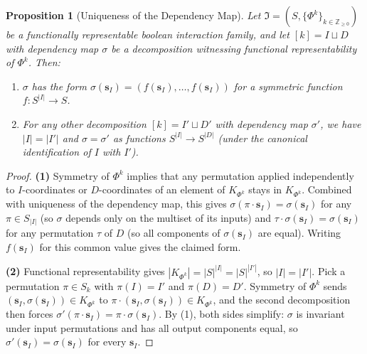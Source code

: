 \documentclass[11pt,reqno]{amsart}
\newcommand{\vecs}{\boldsymbol{s}}
\newcommand{\IFam}{\mathfrak{I}}
\theoremstyle{plain}
\newtheorem{proposition}[theorem]{Proposition}
\theoremstyle{definition}
\numberwithin{equation}{section}
\begin{document}
\begin{proposition}[Uniqueness of the Dependency Map]
\label{prop:func_decomp_equiv}
Let $\IFam = (S, \{\Phi^k\}_{k \in \mathbb{Z}_{\geq 0}})$ be a
functionally representable boolean interaction family, and let
$[k] = I \sqcup D$ with dependency map $\sigma$ be a decomposition
witnessing functional representability of $\Phi^k$. Then:
\begin{enumerate}
    \item $\sigma$ has the form $\sigma(\vecs_I) = (f(\vecs_I),
    \ldots, f(\vecs_I))$ for a symmetric function $f \colon S^{|I|}
    \to S$.
    \item For any other decomposition $[k] = I' \sqcup D'$ with
    dependency map $\sigma'$,
    we have $|I| = |I'|$ and $\sigma = \sigma'$ as functions $S^{|I|}
    \to S^{|D|}$ (under the canonical identification of $I$ with
    $I'$).
\end{enumerate}
\end{proposition}
\begin{proof}
\textbf{(1)} Symmetry of $\Phi^k$ implies that any permutation
applied independently to $I$-coordinates or $D$-coordinates of an
element of $K_{\Phi^k}$ stays in $K_{\Phi^k}$. Combined with
uniqueness of the dependency map, this gives $\sigma(\pi \cdot
\vecs_I) = \sigma(\vecs_I)$ for any $\pi \in S_{|I|}$ (so $\sigma$
depends only on the multiset of its inputs) and $\tau \cdot
\sigma(\vecs_I) = \sigma(\vecs_I)$ for any permutation $\tau$ of $D$
(so all components of $\sigma(\vecs_I)$ are equal). Writing
$f(\vecs_I)$ for this common value gives the claimed form.

\textbf{(2)} Functional representability gives $|K_{\Phi^k}| =
|S|^{|I|} = |S|^{|I'|}$, so $|I| = |I'|$. Pick a permutation $\pi
\in S_k$ with $\pi(I) = I'$ and $\pi(D) = D'$. Symmetry of $\Phi^k$
sends $(\vecs_I, \sigma(\vecs_I)) \in K_{\Phi^k}$ to $\pi \cdot
(\vecs_I, \sigma(\vecs_I)) \in K_{\Phi^k}$, and the second
decomposition then forces $\sigma'(\pi \cdot \vecs_I) = \pi \cdot
\sigma(\vecs_I)$. By (1), both sides simplify: $\sigma$ is invariant
under input permutations and has all output components equal, so
$\sigma'(\vecs_I) = \sigma(\vecs_I)$ for every $\vecs_I$.
\end{proof}
\end{document}
